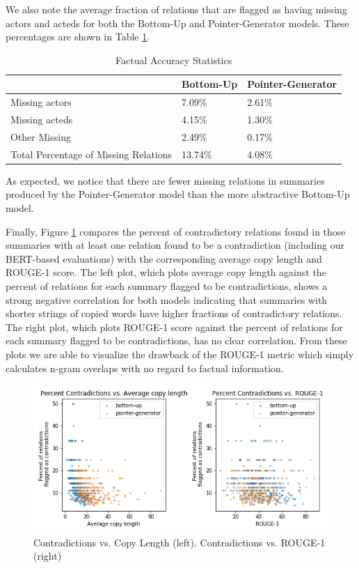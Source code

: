 \documentclass{article}
\begin{document}
We also note the average fraction of relations that are flagged as having missing actors and acteds for both the Bottom-Up and Pointer-Generator models. These percentages are shown in Table \ref{fig:missing}.

\begin{table}[H]
  \centering
  \begin{tabular}{m{8em}||m{5em}|m{5em}}
  & Bottom-Up & Pointer-Generator \\
  \hline
Missing actors & 7.09\% & 2.61\%  \\
\hline
Missing acteds & 4.15\% & 1.30\% \\
\hline
Other Missing & 2.49\% & 0.17\% \\
\hline
Total Percentage of Missing Relations & 13.74\% & 4.08\% 
\end{tabular}
 \caption{Factual Accuracy Statistics}
  \label{fig:missing}
\end{table}

As expected, we notice that there are fewer missing relations in summaries produced by the Pointer-Generator model than the more abstractive Bottom-Up model.

Finally, Figure \ref{fig:contradictions} compares the percent of contradictory relations found in those summaries with at least one relation found to be a contradiction (including our BERT-based evaluations) with the corresponding average copy length and ROUGE-1 score. The left plot, which plots average copy length against the percent of relations for each summary flagged to be contradictions, shows a strong negative correlation for both models indicating that summaries with shorter strings of copied words have higher fractions of contradictory relations. The right plot, which plots ROUGE-1 score against the percent of relations for each summary flagged to be contradictions, has no clear correlation. From these plots we are able to visualize the drawback of the ROUGE-1 metric which simply calculates n-gram overlaps with no regard to factual information.

\begin{figure}
  \centering
  \includegraphics[width=\linewidth]{figs/contradictions-bu-pg.png}
  \caption{Contradictions vs. Copy Length (left). Contradictions vs. ROUGE-1 (right)}
  \label{fig:contradictions}
\end{figure}
\end{document}
